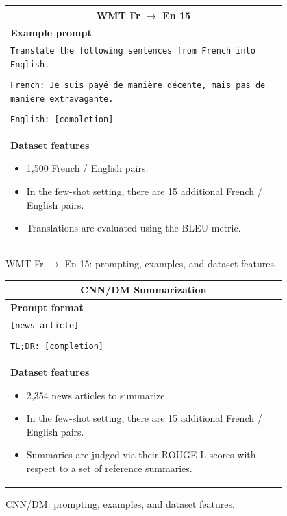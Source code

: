 \documentclass{article}
\begin{document}
\begin{figure}[p]
    \centering \small
    \begin{tabular}{p{0.95\linewidth}}
    \toprule
    \multicolumn{1}{c}{\textbf{WMT Fr $\rightarrow$ En 15}} \\

    \midrule
    \textbf{Example prompt}  \\
    \texttt{Translate the following sentences from French into English.} \\\\
    \texttt{French: Je suis payé de manière décente, mais pas de manière extravagante.} \\\\
    \texttt{English: [completion]} \\

    \midrule
    \textbf{Dataset features}
    \begin{itemize}
        \item 1,500 French / English pairs.
        \item In the few-shot setting, there are 15 additional French / English pairs.
        \item Translations are evaluated using the BLEU metric.
    \end{itemize} \\

    \bottomrule
    \end{tabular}
    \caption{WMT Fr $\rightarrow$ En 15: prompting, examples, and dataset features.}
    \label{tab:prompt-wmt}
\end{figure}

\begin{figure}[p]
    \centering \small
    \begin{tabular}{p{0.95\linewidth}}
    \toprule
    \multicolumn{1}{c}{\textbf{CNN/DM Summarization}} \\

    \midrule
    \textbf{Prompt format}  \\
    \texttt{[news article]} \\\\
    \texttt{TL;DR: [completion]} \\

    \midrule
    \textbf{Dataset features}
    \begin{itemize}
        \item 2,354 news articles to summarize.
        \item In the few-shot setting, there are 15 additional French / English pairs.
        \item Summaries are judged via their ROUGE-L scores with respect to a set of reference summaries.
    \end{itemize} \\
    \bottomrule

    \end{tabular}
    \caption{CNN/DM: prompting, examples, and dataset features.}
    \label{tab:prompt-cnndm}
\end{figure}
\end{document}
